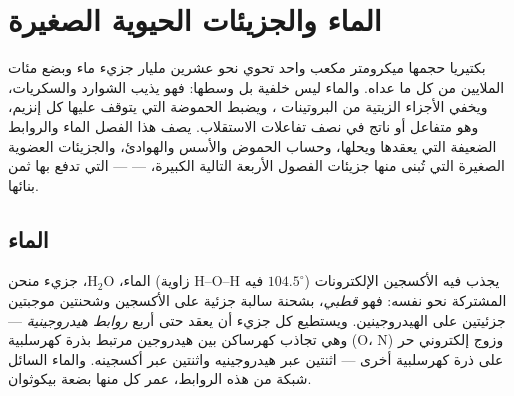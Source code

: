 \chapter{الماء والجزيئات الحيوية الصغيرة}\label{ch:b1:water-small-molecules}

بكتيريا حجمها ميكرومتر مكعب واحد تحوي نحو عشرين مليار جزيء ماء وبضع
مئات الملايين من كل ما عداه. والماء ليس خلفية  بل وسطها: فهو
يذيب الشوارد والسكريات، ويخفي الأجزاء الزيتية من البروتينات
، ويضبط الحموضة التي يتوقف عليها كل إنزيم، وهو متفاعل أو
ناتج في نصف تفاعلات الاستقلاب. يصف هذا الفصل الماء والروابط الضعيفة
التي يعقدها ويحلها، وحساب الحموض والأسس والهوادئ، والجزيئات العضوية
الصغيرة التي تُبنى منها جزيئات الفصول الأربعة التالية الكبيرة،  ---  --- التي تدفع بها  ثمن بنائها.

\section{الماء}

\begin{definition}\label{def:b1:water-small-molecules:water}
الماء، $\mathrm{H_2O}$، جزيء منحن (زاوية H--O--H فيه
$104.5^\circ$) يجذب فيه الأكسجين الإلكترونات المشتركة نحو نفسه: فهو
\emph{قطبي}، بشحنة سالبة جزئية على الأكسجين وشحنتين
موجبتين جزئيتين على الهيدروجينين. ويستطيع كل جزيء أن يعقد حتى أربع
\emph{روابط هيدروجينية} --- وهي تجاذب
كهرساكن بين هيدروجين مرتبط بذرة كهرسلبية (O، N) وزوج إلكتروني حر على
ذرة كهرسلبية أخرى --- اثنتين عبر هيدروجينيه واثنتين عبر أكسجينه.
والماء السائل شبكة من هذه الروابط، عمر كل منها بضعة بيكوثوان.
\end{definition}


